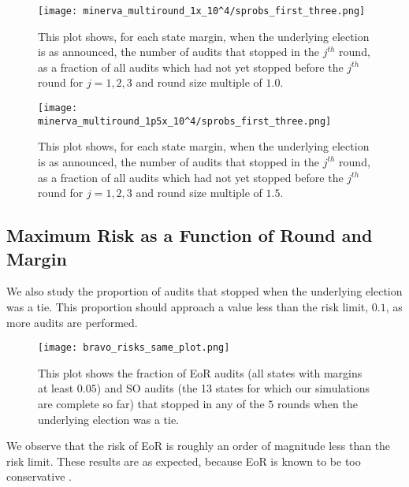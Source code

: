 \begin{figure}
\texttt{[image: minerva\_multiround\_1x\_10^4/sprobs\_first\_three.png]}
\caption{This plot shows, for each state margin, when the underlying election is as announced, the number of \Minerva audits that stopped in the $j^{th}$ round,
as a fraction of all \Minerva audits which had not yet stopped before the $j^{th}$ round for $j=1,2,3$ and round size multiple of $1.0$.}
\label{fig:minerva1_sprob}
\end{figure}

\begin{figure}
\texttt{[image: minerva\_multiround\_1p5x\_10^4/sprobs\_first\_three.png]}
\caption{This plot shows, for each state margin, when the underlying election is as announced, the number of \Minerva audits that stopped in the $j^{th}$ round,
as a fraction of all \Minerva audits which had not yet stopped before the $j^{th}$ round for $j=1,2,3$ and round size multiple of $1.5$.}
\label{fig:minerva1p5_sprob}
\end{figure}

\subsection{Maximum Risk as a Function of Round and Margin}
We also study the proportion of audits that stopped when the underlying election was a tie.
This proportion should approach a value less than the risk limit, $0.1$, as more audits are performed.


\begin{figure}
\texttt{[image: bravo\_risks\_same\_plot.png]}
\caption{This plot shows the fraction of EoR \BRAVO audits (all states with margins at least $0.05$) and SO \BRAVO audits (the 13 states for which our simulations are complete so far) that stopped in any of the $5$ rounds when the underlying election was a tie.}
\label{fig:bravo_risk}
\end{figure}

We observe that the risk of EoR \BRAVO is roughly
an order of magnitude less than the risk limit. 
These results are as expected, because EoR \BRAVO is known to be too conservative \cite{usenix_minerva}.  

